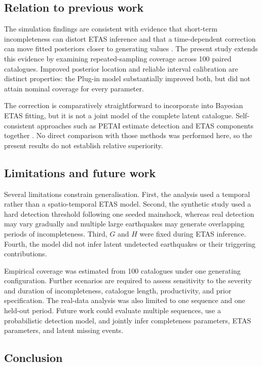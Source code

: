 \documentclass{statsmsc}
\begin{document}
\subsection{Relation to previous work}

The simulation findings are consistent with evidence that short-term
incompleteness can distort ETAS inference \citep{seif2017,naylor2023} and that
a time-dependent correction can move fitted posteriors closer to generating
values \citep{kamranzad2025}. The present study extends this evidence by
examining repeated-sampling coverage across 100 paired catalogues. Improved
posterior location and reliable interval calibration are distinct properties:
the Plug-in model substantially improved both, but did not attain nominal
coverage for every parameter.

The correction is comparatively straightforward to incorporate into Bayesian
ETAS fitting, but it is not a joint model of the complete latent catalogue.
Self-consistent approaches such as PETAI estimate detection and ETAS
components together \citep{mizrahi2021}. No direct comparison with those
methods was performed here, so the present results do not establish relative
superiority.

\subsection{Limitations and future work}

Several limitations constrain generalisation. First, the analysis used a
temporal rather than a spatio-temporal ETAS model. Second, the synthetic study
used a hard detection threshold following one seeded mainshock, whereas real
detection may vary gradually and multiple large earthquakes may generate
overlapping periods of incompleteness. Third, \(G\) and \(H\) were fixed
during ETAS inference. Fourth, the model did not infer latent undetected
earthquakes or their triggering contributions.

Empirical coverage was estimated from 100 catalogues under one generating
configuration. Further scenarios are required to assess sensitivity to the
severity and duration of incompleteness, catalogue length, productivity, and
prior specification. The real-data analysis was also limited to one sequence
and one held-out period. Future work could evaluate multiple sequences, use a
probabilistic detection model, and jointly infer completeness parameters,
ETAS parameters, and latent missing events.

\subsection{Conclusion}
\end{document}
